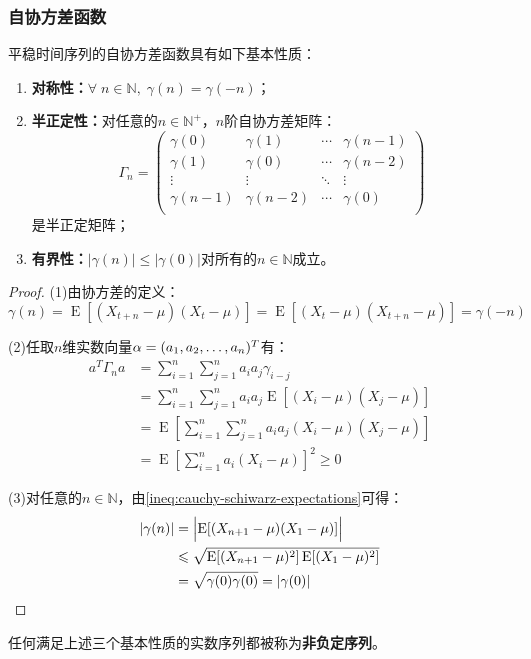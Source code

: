 \subsubsection{自协方差函数}
\begin{property}
	平稳时间序列的自协方差函数具有如下基本性质：
	\begin{enumerate}
		\item \textbf{对称性：}$\forall\;n\in\mathbb{N},\;\gamma(n)=\gamma(-n)$；
		\item \textbf{半正定性：}对任意的$n\in\mathbb{N}^+$，$n$阶自协方差矩阵：
		\begin{equation*}
			\Gamma_n=
			\begin{pmatrix}
				\gamma(0) & \gamma(1) & \cdots & \gamma(n-1) \\
				\gamma(1) & \gamma(0) & \cdots & \gamma(n-2) \\
				\vdots & \vdots & \ddots & \vdots \\
				\gamma(n-1) & \gamma(n-2) & \cdots & \gamma(0) \\
			\end{pmatrix}
		\end{equation*}
		是半正定矩阵；
		\item \textbf{有界性：}$|\gamma(n)|\leqslant|\gamma(0)|$对所有的$n\in\mathbb{N}$成立。
	\end{enumerate}
\end{property}
\begin{proof}
	(1)由协方差的定义：
	\begin{equation*}
		\gamma(n)=\operatorname{E}[(X_{t+n}-\mu)(X_t-\mu)]=\operatorname{E}[(X_t-\mu)(X_{t+n}-\mu)]=\gamma(-n)
	\end{equation*}\par
	(2)任取$n$维实数向量$\alpha=(a_1, a_2, \dots, a_{n})^T$有：
	\begin{align*}
		a^T\Gamma_na
		&=\sum_{i=1}^{n}\sum_{j=1}^{n}a_ia_j\gamma_{i-j} \\
		&=\sum_{i=1}^{n}\sum_{j=1}^{n}a_ia_j\operatorname{E}[(X_i-\mu)(X_j-\mu)]\\
		&=\operatorname{E}\left[\sum_{i=1}^{n}\sum_{j=1}^{n}a_ia_j(X_i-\mu)(X_j-\mu)\right] \\
		&=\operatorname{E}\left[\sum_{i=1}^{n}a_i(X_i-\mu)\right]^2\geqslant0
	\end{align*}\par
	(3)对任意的$n\in \mathbb{N}$，由\cref{ineq:cauchy-schiwarz-expectations}可得：
	\begin{align*}
		|\gamma(n)|
		&=\Bigl|\operatorname{E}[(X_{n+1}-\mu)(X_1-\mu)]\Bigr| \\
		&\leqslant\sqrt{\operatorname{E}[(X_{n+1}-\mu)^2]\operatorname{E}[(X_1-\mu)^2]} \\
		&=\sqrt{\gamma(0)\gamma(0)}=|\gamma(0)|\qedhere
	\end{align*}
\end{proof}
\begin{definition}
	任何满足上述三个基本性质的实数序列都被称为\textbf{非负定序列}。
\end{definition}
